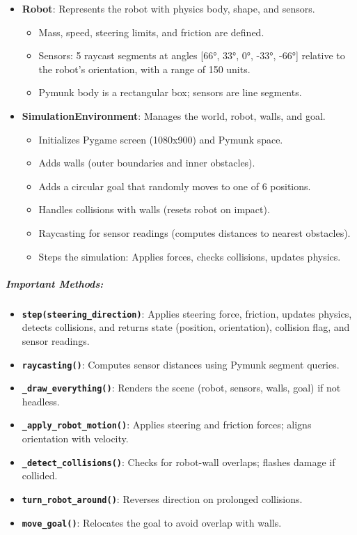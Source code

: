 \begin{itemize}
\item \textbf{Robot}: Represents the robot with physics body, shape, and sensors.

\begin{itemize}
\item Mass, speed, steering limits, and friction are defined.
\item Sensors: 5 raycast segments at angles [66°, 33°, 0°, -33°, -66°] relative to the robot's orientation, with a range of 150 units.
\item Pymunk body is a rectangular box; sensors are line segments.
\end{itemize}


\item \textbf{SimulationEnvironment}: Manages the world, robot, walls, and goal.

\begin{itemize}
\item Initializes Pygame screen (1080x900) and Pymunk space.
\item Adds walls (outer boundaries and inner obstacles).
\item Adds a circular goal that randomly moves to one of 6 positions.
\item Handles collisions with walls (resets robot on impact).
\item Raycasting for sensor readings (computes distances to nearest obstacles).
\item Steps the simulation: Applies forces, checks collisions, updates physics.
\end{itemize}
\end{itemize}

\subparagraph{Important Methods:}

\begin{itemize}
\item \textbf{\texttt{step(steering\_direction)}}: Applies steering force, friction, updates physics, detects collisions, and returns state (position, orientation), collision flag, and sensor readings.
\item \textbf{\texttt{raycasting()}}: Computes sensor distances using Pymunk segment queries.
\item \textbf{\texttt{\_draw\_everything()}}: Renders the scene (robot, sensors, walls, goal) if not headless.
\item \textbf{\texttt{\_apply\_robot\_motion()}}: Applies steering and friction forces; aligns orientation with velocity.
\item \textbf{\texttt{\_detect\_collisions()}}: Checks for robot-wall overlaps; flashes damage if collided.
\item \textbf{\texttt{turn\_robot\_around()}}: Reverses direction on prolonged collisions.
\item \textbf{\texttt{move\_goal()}}: Relocates the goal to avoid overlap with walls.
\end{itemize}

